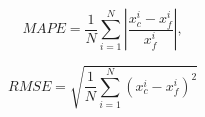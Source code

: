 \documentclass{article}
\begin{document}
 
\begin{equation} \label{mape}
MAPE=\frac{1}{N}\sum_{i=1}^N{\left\vert\frac{x_c^i-x_f^i}{x_f^i}\right\vert},
\end{equation}

\begin{equation} \label{rmse}
RMSE=\sqrt{\frac{1}{N}\sum_{i=1}^N{(x_c^i-x_f^i)^2}}
\end{equation}
\end{document}
